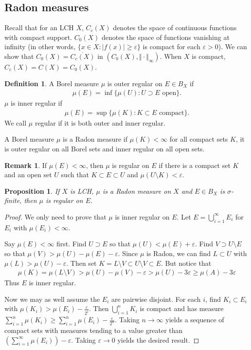 \documentclass[11pt]{amsart}
\newtheorem{proposition}[theorem]{Proposition}
\theoremstyle{definition}
\newtheorem{definition}[theorem]{Definition}
\newtheorem{remark}[theorem]{Remark}
\numberwithin{equation}{section}
\begin{document}
\subsection{Radon measures}\label{sec:radon}
Recall that for an LCH $X$, $C_c(X)$ denotes the space of continuous functions with compact support. $C_0(X)$ denotes the space of functions vanishing at infinity (in other words, $\{x\in X:|f(x)|\ge\varepsilon\}$ is compact for each $\varepsilon>0$). We can show that $C_0(X)=\overline{C_c(X)}$ in $(C_b(X),\Vert\cdot\Vert_\infty)$. When $X$ is compact, $C_c(X)=C(X)=C_0(X)$.
\begin{definition}
    A Borel measure $\mu$ is outer regular on $E\in B_X$ if 
    \begin{align*}
        \mu(E)=\inf\{\mu(U):U\supset E\text{ open}\}.
    \end{align*}
    $\mu$ is inner regular if
    \begin{align*}
        \mu(E)=\sup\{\mu(K):K\subset E\text{ compact}\}.
    \end{align*}
    We call $\mu$ regular if it is both outer and inner regular.

    A Borel measure $\mu$ is a Radon measure if $\mu(K)<\infty$ for all compact sets $K$, it is outer regular on all Borel sets and inner regular on all open sets.
\end{definition}
\begin{remark}
    If $\mu(E)<\infty$, then $\mu$ is regular on $E$ if there is a compact set $K$ and an open set $U$ such that $K\subset E\subset U$ and $\mu(U\setminus K)<\varepsilon$.
\end{remark}
\begin{proposition}
    If $X$ is LCH, $\mu$ is a Radon measure on $X$ and $E\in B_X$ is $\sigma$-finite, then $\mu$ is regular on $E$.
\end{proposition}
\begin{proof}
    We only need to prove that $\mu$ is inner regular on $E$. Let $E=\bigcup_{i=1}^\infty E_i$ for $E_i$ with $\mu(E_i)<\infty$. 

    Say $\mu(E)<\infty$ first. Find $U\supset E$ so that $\mu(U)<\mu(E)+\varepsilon$. Find $V\supset U\setminus E$ so that $\mu(V)>\mu(U)-\mu(E)-\varepsilon$. Since $\mu$ is Radon, we can find $L\subset U$ with $\mu(L)>\mu(U)-\varepsilon$. Then set $K=L\setminus V\subset U\setminus V\subset E$. But notice that 
    \begin{align*}
        \mu(K)=\mu(L\setminus V)>\mu(U)-\mu(V)-\varepsilon>\mu(U)-3\varepsilon\ge\mu(A)-3\varepsilon
    \end{align*}
    Thus $E$ is inner regular.

    Now we may as well assume the $E_i$ are pairwise disjoint. For each $i$, find $K_i\subset E_i$ with $\mu(K_i)>\mu(E_i)-\frac{\varepsilon}{2^i}$. Then $\bigcup_{i=1}^nK_i$ is compact and has measure $\sum_{i=1}^n\mu(K_i)\ge\sum_{i=1}^n\mu(E_i)-\frac{\varepsilon}{2^n}$. Taking $n\to\infty$ yields a sequence of compact sets with measures tending to a value greater than $(\sum_{i=1}^\infty \mu(E_i))-\varepsilon$. Taking $\varepsilon\to 0$ yields the desired result.
\end{proof}
\end{document}
